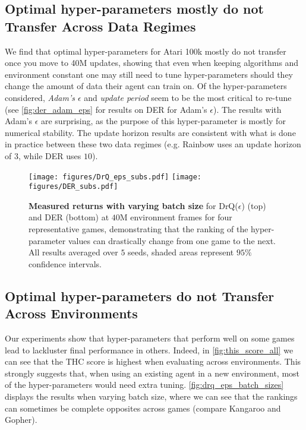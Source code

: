 \documentclass[10pt]{article} %
\begin{document}
\subsection{Optimal hyper-parameters mostly do not Transfer Across Data Regimes}
\label{sec:acrossData}
We find that optimal hyper-parameters for Atari 100k mostly do not transfer once you move to 40M updates, showing that even when keeping algorithms and environment constant one may still need to tune hyper-parameters should they change the amount of data their agent can train on. Of the hyper-parameters considered, {\em Adam's $\epsilon$} and {\em update period} seem to be the most critical to re-tune (see \autoref{fig:der_adam_eps} for results on DER for Adam's $\epsilon$). The results with Adam's $\epsilon$ are surprising, as the purpose of this hyper-parameter is mostly for numerical stability. The update horizon results are consistent with what is done in practice between these two data regimes (e.g. Rainbow uses an update horizon of $3$, while DER uses $10$).

\begin{figure}[!h]
    \centering
  \texttt{[image: figures/DrQ\_eps\_subs.pdf]}
  \texttt{[image: figures/DER\_subs.pdf]}
    \caption{\textbf{Measured returns with varying batch size} for DrQ($\epsilon$) (top) and DER (bottom) at $40$M environment frames for four representative games, demonstrating that the ranking of the hyper-parameter values can drastically change from one game to the next. All results averaged over $5$ seeds, shaded areas represent $95\%$ confidence intervals.
    }%
    \label{fig:drq_eps_batch_sizes}%
\end{figure}


\subsection{Optimal hyper-parameters do not Transfer Across Environments}
\label{sec:acrossEnvironments}
Our experiments show that hyper-parameters that perform well on some games lead to lackluster final performance in others. Indeed, in \autoref{fig:this_score_all} we can see that the THC score is highest when evaluating across environments. This strongly suggests that, when using an existing agent in a new environment, most of the hyper-parameters would need extra tuning.
\autoref{fig:drq_eps_batch_sizes} displays the results when varying batch size, where we can see that the rankings can sometimes be complete opposites across games (compare Kangaroo and Gopher).
 
\end{document}
